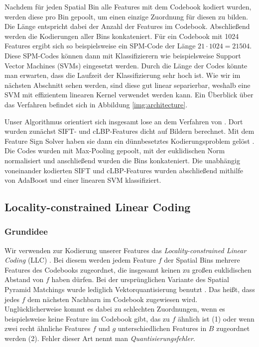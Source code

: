 Nachdem für jeden Spatial Bin alle Features mit dem Codebook kodiert wurden, werden diese pro Bin gepoolt, um einen einzige Zuordnung für diesen zu bilden. Die Länge entspricht dabei der Anzahl der Features im Codebook. Abschließend werden die Kodierungen aller Bins konkateniert. Für ein Codebook mit 1024 Features ergibt sich so beispielsweise ein SPM-Code der Länge $21 \cdot 1024 = 21504$. Diese SPM-Codes können dann mit Klassifizierern wie beispielsweise Support Vector Machines (SVMs) eingesetzt werden. Durch die Länge der Codes könnte man erwarten, dass die Laufzeit der Klassifizierung sehr hoch ist. Wie wir im nächsten Abschnitt sehen werden, sind diese gut linear separierbar, weshalb eine SVM mit effizientem linearen Kernel verwendet werden kann. Ein Überblick über das Verfahren befindet sich in Abbildung \ref{img:architecture}.

Unser Algorithmus orientiert sich insgesamt lose an dem Verfahren von \cite{ywkjwh13}. Dort wurden zunächst SIFT- und cLBP-Features dicht auf Bildern berechnet. Mit dem Feature Sign Solver haben sie dann ein dünnbesetztes Kodierungsproblem gelöst \cite{lbrn07}. Die Codes wurden mit Max-Pooling gepoolt, mit der euklidischen Norm normalisiert und anschließend wurden die Bins konkateniert. Die unabhängig voneinander kodierten SIFT und cLBP-Features wurden abschließend mithilfe von AdaBoost und einer linearen SVM klassifiziert.

\subsection{Locality-constrained Linear Coding}

\subsubsection{Grundidee}

Wir verwenden zur Kodierung unserer Features das \emph{Locality-constrained Linear Coding} (LLC) \cite{wyylhg10}. Bei diesem werden jedem Feature $f$ der Spatial Bins mehrere Features des Codebooks zugeordnet, die insgesamt keinen zu großen euklidischen Abstand von $f$ haben dürfen. Bei der ursprünglichen Variante des Spatial Pyramid Matchings wurde lediglich Vektorquantisierung benutzt \cite{lsp06}. Das heißt, dass jedes $f$ dem nächsten Nachbarn im Codebook zugewiesen wird. Unglücklicherweise kommt es dabei zu schlechten Zuordnungen, wenn es beispielsweise keine Feature im Codebook gibt, das zu $f$ ähnlich ist (1) oder wenn zwei recht ähnliche Features $f$ und $g$ unterschiedlichen Features in $B$ zugeordnet werden (2). Fehler dieser Art nennt man \emph{Quantisierungsfehler}.

